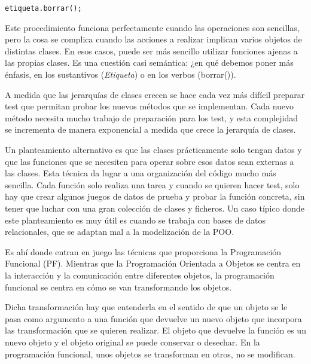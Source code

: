 {\centering \texttt{etiqueta.borrar();} \par}

Este procedimiento funciona perfectamente cuando las operaciones son sencillas, pero la cosa se complica cuando las acciones a realizar implican varios objetos de distintas clases. En esos casos, puede ser más sencillo utilizar funciones ajenas a las propias clases. Es una cuestión casi semántica: ¿en qué debemos poner más énfasis, en los sustantivos (\textit{Etiqueta}) o en los verbos (borrar()).

A medida que las jerarquías de clases crecen se hace cada vez más difícil preparar test que permitan probar los nuevos métodos que se implementan. Cada nuevo método necesita mucho trabajo de preparación para los test, y esta complejidad se incrementa de manera exponencial a medida que crece la jerarquía de clases.

Un planteamiento alternativo es que las clases prácticamente solo tengan datos y que las funciones que se necesiten para operar sobre esos datos sean externas a las clases. Esta técnica da lugar a una organización del código mucho más sencilla. Cada función solo realiza una tarea y cuando se quieren hacer test, solo hay que crear algunos juegos de datos de prueba y probar la función concreta, sin tener que luchar con una gran colección de clases y ficheros. Un caso típico donde este planteamiento es muy útil es cuando se trabaja con bases de datos relacionales, que se adaptan mal a la modelización de la POO.

Es ahí donde entran en juego las técnicas que proporciona la Programación Funcional (PF). Mientras que la Programación Orientada a Objetos se centra en la interacción y la comunicación entre diferentes objetos, la programación funcional se centra en cómo se van transformando los objetos. 

Dicha transformación hay que entenderla en el sentido de que un objeto se le pasa como argumento a una función que devuelve un nuevo objeto que incorpora las transformación que se quieren realizar. El objeto que devuelve la función es un nuevo objeto y el objeto original se puede conservar o desechar. En la programación funcional, unos objetos se transforman en otros, no se modifican.

\vfill\null

